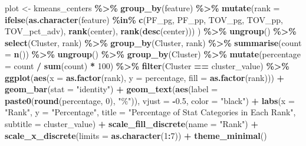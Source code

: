 \documentclass[
]{article}
\newenvironment{Shaded}{\begin{snugshade}}{\end{snugshade}}
\newcommand{\AttributeTok}[1]{\textcolor[rgb]{0.13,0.29,0.53}{#1}}
\newcommand{\DecValTok}[1]{\textcolor[rgb]{0.00,0.00,0.81}{#1}}
\newcommand{\FloatTok}[1]{\textcolor[rgb]{0.00,0.00,0.81}{#1}}
\newcommand{\FunctionTok}[1]{\textcolor[rgb]{0.13,0.29,0.53}{\textbf{#1}}}
\newcommand{\NormalTok}[1]{#1}
\newcommand{\OtherTok}[1]{\textcolor[rgb]{0.56,0.35,0.01}{#1}}
\newcommand{\SpecialCharTok}[1]{\textcolor[rgb]{0.81,0.36,0.00}{\textbf{#1}}}
\newcommand{\StringTok}[1]{\textcolor[rgb]{0.31,0.60,0.02}{#1}}
\begin{document}
\begin{Shaded}
\begin{Highlighting}[]
\NormalTok{  plot }\OtherTok{\textless{}{-}}\NormalTok{ kmeans\_centers }\SpecialCharTok{\%\textgreater{}\%}
    \FunctionTok{group\_by}\NormalTok{(feature) }\SpecialCharTok{\%\textgreater{}\%}
    \FunctionTok{mutate}\NormalTok{(}\AttributeTok{rank =} \FunctionTok{ifelse}\NormalTok{(}\FunctionTok{as.character}\NormalTok{(feature) }\SpecialCharTok{\%in\%} \FunctionTok{c}\NormalTok{(}\StringTok{\textquotesingle{}PF\_pg\textquotesingle{}}\NormalTok{, }\StringTok{\textquotesingle{}PF\_pp\textquotesingle{}}\NormalTok{, }\StringTok{\textquotesingle{}TOV\_pg\textquotesingle{}}\NormalTok{, }\StringTok{\textquotesingle{}TOV\_pp\textquotesingle{}}\NormalTok{, }\StringTok{\textquotesingle{}TOV\_pct\_adv\textquotesingle{}}\NormalTok{), }
                         \FunctionTok{rank}\NormalTok{(center), }
                         \FunctionTok{rank}\NormalTok{(}\FunctionTok{desc}\NormalTok{(center)))}
\NormalTok{    ) }\SpecialCharTok{\%\textgreater{}\%}
    \FunctionTok{ungroup}\NormalTok{() }\SpecialCharTok{\%\textgreater{}\%}
    \FunctionTok{select}\NormalTok{(Cluster, rank) }\SpecialCharTok{\%\textgreater{}\%}
    \FunctionTok{group\_by}\NormalTok{(Cluster, rank) }\SpecialCharTok{\%\textgreater{}\%}
    \FunctionTok{summarise}\NormalTok{(}\AttributeTok{count =} \FunctionTok{n}\NormalTok{()) }\SpecialCharTok{\%\textgreater{}\%}
    \FunctionTok{ungroup}\NormalTok{() }\SpecialCharTok{\%\textgreater{}\%}
    \FunctionTok{group\_by}\NormalTok{(Cluster) }\SpecialCharTok{\%\textgreater{}\%}
    \FunctionTok{mutate}\NormalTok{(}\AttributeTok{percentage =}\NormalTok{ count }\SpecialCharTok{/} \FunctionTok{sum}\NormalTok{(count) }\SpecialCharTok{*} \DecValTok{100}\NormalTok{) }\SpecialCharTok{\%\textgreater{}\%}
    \FunctionTok{filter}\NormalTok{(Cluster }\SpecialCharTok{==}\NormalTok{ cluster\_value) }\SpecialCharTok{\%\textgreater{}\%}
    \FunctionTok{ggplot}\NormalTok{(}\FunctionTok{aes}\NormalTok{(}\AttributeTok{x =} \FunctionTok{as.factor}\NormalTok{(rank), }\AttributeTok{y =}\NormalTok{ percentage, }\AttributeTok{fill =} \FunctionTok{as.factor}\NormalTok{(rank))) }\SpecialCharTok{+}
    \FunctionTok{geom\_bar}\NormalTok{(}\AttributeTok{stat =} \StringTok{"identity"}\NormalTok{) }\SpecialCharTok{+}
    \FunctionTok{geom\_text}\NormalTok{(}\FunctionTok{aes}\NormalTok{(}\AttributeTok{label =} \FunctionTok{paste0}\NormalTok{(}\FunctionTok{round}\NormalTok{(percentage, }\DecValTok{0}\NormalTok{), }\StringTok{"\%"}\NormalTok{)), }\AttributeTok{vjust =} \SpecialCharTok{{-}}\FloatTok{0.5}\NormalTok{, }\AttributeTok{color =} \StringTok{"black"}\NormalTok{) }\SpecialCharTok{+}
    \FunctionTok{labs}\NormalTok{(}\AttributeTok{x =} \StringTok{"Rank"}\NormalTok{, }\AttributeTok{y =} \StringTok{"Percentage"}\NormalTok{,}
         \AttributeTok{title =} \StringTok{"Percentage of Stat Categories in Each Rank"}\NormalTok{, }\AttributeTok{subtitle =}\NormalTok{ cluster\_value) }\SpecialCharTok{+}
    \FunctionTok{scale\_fill\_discrete}\NormalTok{(}\AttributeTok{name =} \StringTok{"Rank"}\NormalTok{) }\SpecialCharTok{+}
    \FunctionTok{scale\_x\_discrete}\NormalTok{(}\AttributeTok{limits =} \FunctionTok{as.character}\NormalTok{(}\DecValTok{1}\SpecialCharTok{:}\DecValTok{7}\NormalTok{)) }\SpecialCharTok{+}
    \FunctionTok{theme\_minimal}\NormalTok{()}
  

\end{Highlighting}
\end{Shaded}
\end{document}
